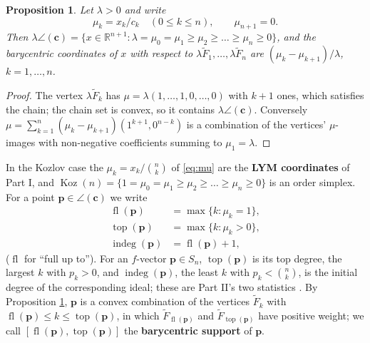 \documentclass[11pt, a4paper, abstract=yes]{scrartcl}
\theoremstyle{definition}
\theoremstyle{remark}
\theoremstyle{plain}
\newtheorem{proposition}[definition]{Proposition}
\newcommand{\vek}[1]{\boldsymbol{#1}}
\theoremstyle{remark}
\theoremstyle{plain}
\newcommand{\Koz}{\operatorname{Koz}}
\newcommand{\indeg}{\operatorname{indeg}}
\newcommand{\tp}{\operatorname{top}}
\newcommand{\rasimp}{\angle}
\newcommand{\fl}{\operatorname{fl}}
\newcommand{\leandiscof}[1]{\tikz[baseline=-0.6ex]\fill[#1] (0,0) circle (0.6ex);}
\newcommand{\leanfull}{\leandiscof{leanfull}}
\newcommand{\leanmark}[1]{\leavevmode{\reversemarginpar\marginnote{\raggedleft#1}}}
\begin{document}
\begin{proposition}
\leanmark{\leanfull}Let \(\lambda>0\) and write
\begin{equation}\label{eq:mu}
  \mu_k=x_k/c_k\quad(0\le k\le n),\qquad\mu_{n+1}=0 .
\end{equation}
Then
\(\lambda\rasimp(\vek c)=\lbrace x\in\mathbb R^{n+1}:\lambda=\mu_0=\mu_1\ge\mu_2\ge\dots\ge\mu_n\ge0\rbrace\),
and the barycentric coordinates of \(x\) with respect to \(\lambda\tilde F_1,\dots,\lambda\tilde F_n\)
are \((\mu_k-\mu_{k+1})/\lambda\), \(k=1,\dots,n\).
\label{prop-rank-one-H}
\end{proposition}

\begin{proof}
The vertex \(\lambda\tilde F_k\) has \(\mu=\lambda(1,\dots,1,0,\dots,0)\) with \(k+1\) ones, which
satisfies the chain; the chain set is convex, so it contains \(\lambda\rasimp(\vek c)\). Conversely
\(\mu=\sum_{k=1}^n(\mu_k-\mu_{k+1})(1^{k+1},0^{n-k})\) is a combination of the vertices'
\(\mu\)-images with non-negative coefficients summing to \(\mu_1=\lambda\).
\end{proof}

In the Kozlov case the \(\mu_k=x_k/\binom nk\) of \eqref{eq:mu} are the \textbf{LYM coordinates} of Part I, and
\(\Koz(n)=\lbrace1=\mu_0=\mu_1\ge\mu_2\ge\dots\ge\mu_n\ge0\rbrace\) is an order simplex. For a point
\(\vek p\in\rasimp(\vek c)\) we write
\begin{align}
  \fl(\vek p)&=\max\lbrace k:\mu_k=1\rbrace,\label{eq:fl}\\
  \tp(\vek p)&=\max\lbrace k:\mu_k>0\rbrace,\label{eq:tp}\\
  \indeg(\vek p)&=\fl(\vek p)+1,\label{eq:indeg}
\end{align}
(\(\fl\) for ``full up to''). For an \(f\)-vector \(\vek p\in S_n\), \(\tp(\vek p)\) is its top degree,
the largest \(k\) with \(p_k>0\), and \(\indeg(\vek p)\), the least \(k\) with \(p_k<\binom nk\), is
the initial degree of the corresponding ideal; these are Part II's two statistics
\autocite[Section 5]{SnellmanArticle2}. By Proposition \ref{prop-rank-one-H}, \(\vek p\) is a convex
combination of the vertices \(\tilde F_k\) with \(\fl(\vek p)\le k\le\tp(\vek p)\), in which
\(\tilde F_{\fl(\vek p)}\) and \(\tilde F_{\tp(\vek p)}\) have positive weight; we call
\([\fl(\vek p),\tp(\vek p)]\) the \textbf{barycentric support} of \(\vek p\).
\end{document}
